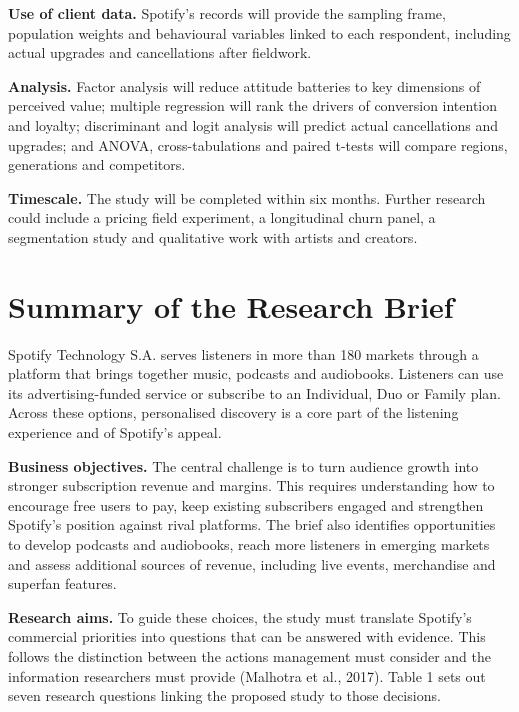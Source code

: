 \documentclass[11pt,a4paper]{article}
\begin{document}
\textbf{Use of client data.} Spotify's records will provide the sampling frame, population weights and behavioural variables linked to each respondent, including actual upgrades and cancellations after fieldwork.

\textbf{Analysis.} Factor analysis will reduce attitude batteries to key dimensions of perceived value; multiple regression will rank the drivers of conversion intention and loyalty; discriminant and logit analysis will predict actual cancellations and upgrades; and ANOVA, cross-tabulations and paired t-tests will compare regions, generations and competitors.

\textbf{Timescale.} The study will be completed within six months. Further research could include a pricing field experiment, a longitudinal churn panel, a segmentation study and qualitative work with artists and creators.

\section{Summary of the Research Brief}
Spotify Technology S.A. serves listeners in more than 180 markets through a platform that brings together music, podcasts and audiobooks. Listeners can use its advertising-funded service or subscribe to an Individual, Duo or Family plan. Across these options, personalised discovery is a core part of the listening experience and of Spotify's appeal.

\textbf{Business objectives.} The central challenge is to turn audience growth into stronger subscription revenue and margins. This requires understanding how to encourage free users to pay, keep existing subscribers engaged and strengthen Spotify's position against rival platforms. The brief also identifies opportunities to develop podcasts and audiobooks, reach more listeners in emerging markets and assess additional sources of revenue, including live events, merchandise and superfan features.

\textbf{Research aims.} To guide these choices, the study must translate Spotify's commercial priorities into questions that can be answered with evidence. This follows the distinction between the actions management must consider and the information researchers must provide (Malhotra et al., 2017). Table 1 sets out seven research questions linking the proposed study to those decisions.
\end{document}

